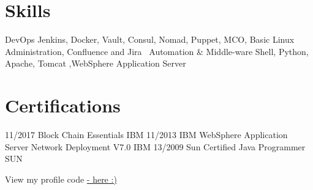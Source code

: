 \documentclass[]{friggeri-cv}
\begin{document}
\section{Skills}
\begin{entrylist}
 \entry
    { }
    {DevOps}
    {}
    {Jenkins, Docker, Vault, Consul, Nomad, Puppet, MCO, Basic Linux Administration, Confluence and  Jira }
 \entry
    { }
    {Automation \& Middle-ware}
    {}
    {Shell, Python, Apache, Tomcat ,WebSphere Application Server}
\end{entrylist}
\section{Certifications}
\begin{entrylist}
  \entry
    {11/2017}
    {Block Chain Essentials}
    {IBM}
    {}
    \entry
    {11/2013}
    {IBM WebSphere Application Server Network Deployment V7.0}
    {IBM}
    {}
    \entry
    {13/2009}
    {Sun Certified Java Programmer}
    {SUN}
    {}
\end{entrylist}
\begin{flushright}
\footnotesize{}
\footnotesize {}
\footnotesize{ View my profile code \href{https://github.com/satheeshCharles/Satheesh_Charles_DevOps_Profile}{ - here :) }} \\
\end{flushright}
\end{document}
